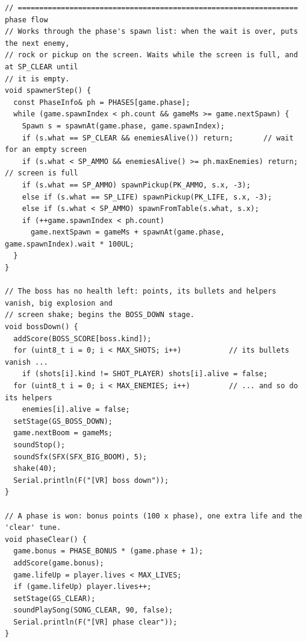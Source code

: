 \documentclass[11pt,a4paper]{article}
\begin{document}
\begin{lstlisting}[language=Arduino]
// ================================================================= phase flow
// Works through the phase's spawn list: when the wait is over, puts the next enemy,
// rock or pickup on the screen. Waits while the screen is full, and at SP_CLEAR until
// it is empty.
void spawnerStep() {
  const PhaseInfo& ph = PHASES[game.phase];
  while (game.spawnIndex < ph.count && gameMs >= game.nextSpawn) {
    Spawn s = spawnAt(game.phase, game.spawnIndex);
    if (s.what == SP_CLEAR && enemiesAlive()) return;       // wait for an empty screen
    if (s.what < SP_AMMO && enemiesAlive() >= ph.maxEnemies) return;   // screen is full
    if (s.what == SP_AMMO) spawnPickup(PK_AMMO, s.x, -3);
    else if (s.what == SP_LIFE) spawnPickup(PK_LIFE, s.x, -3);
    else if (s.what < SP_AMMO) spawnFromTable(s.what, s.x);
    if (++game.spawnIndex < ph.count)
      game.nextSpawn = gameMs + spawnAt(game.phase, game.spawnIndex).wait * 100UL;
  }
}

// The boss has no health left: points, its bullets and helpers vanish, big explosion and
// screen shake; begins the BOSS_DOWN stage.
void bossDown() {
  addScore(BOSS_SCORE[boss.kind]);
  for (uint8_t i = 0; i < MAX_SHOTS; i++)           // its bullets vanish ...
    if (shots[i].kind != SHOT_PLAYER) shots[i].alive = false;
  for (uint8_t i = 0; i < MAX_ENEMIES; i++)         // ... and so do its helpers
    enemies[i].alive = false;
  setStage(GS_BOSS_DOWN);
  game.nextBoom = gameMs;
  soundStop();
  soundSfx(SFX(SFX_BIG_BOOM), 5);
  shake(40);
  Serial.println(F("[VR] boss down"));
}

// A phase is won: bonus points (100 x phase), one extra life and the 'clear' tune.
void phaseClear() {
  game.bonus = PHASE_BONUS * (game.phase + 1);
  addScore(game.bonus);
  game.lifeUp = player.lives < MAX_LIVES;
  if (game.lifeUp) player.lives++;
  setStage(GS_CLEAR);
  soundPlaySong(SONG_CLEAR, 90, false);
  Serial.println(F("[VR] phase clear"));
}


\end{lstlisting}
\end{document}
